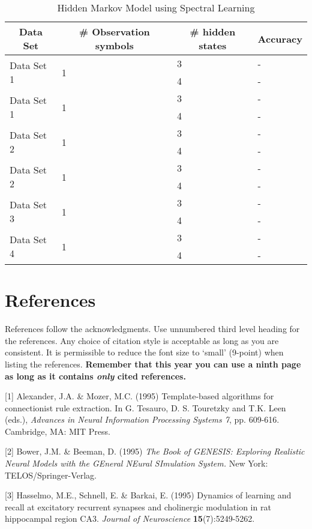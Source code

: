 \documentclass{article} %
\begin{document}
\begin{table}[t]
\caption{Hidden Markov Model using Spectral Learning}
\label{Spectral Learning}
\begin{center}
\begin{tabular}{ |l|l|l|l| }
\hline
\multicolumn{1}{|c|}{\bf Data Set} &\multicolumn{1}{|c|}{\bf \# Observation symbols} &\multicolumn{1}{|c|}{\bf \# hidden states} &\multicolumn{1}{|c|}{\bf Accuracy}\\
\hline
\multirow{2}{*}{Data Set 1}& \multirow{2}{*}{1} & 3 & - \\
& & 4 & - \\
\hline
\multirow{2}{*}{Data Set 1}& \multirow{2}{*}{1} & 3 & - \\
& & 4 & - \\
\hline
\multirow{2}{*}{Data Set 2}& \multirow{2}{*}{1} & 3 & - \\
& & 4 & - \\
\hline
\multirow{2}{*}{Data Set 2}& \multirow{2}{*}{1} & 3 & - \\
& & 4 & - \\
\hline
\multirow{2}{*}{Data Set 3}& \multirow{2}{*}{1} & 3 & - \\
& & 4 & - \\
\hline
\multirow{2}{*}{Data Set 4}& \multirow{2}{*}{1} & 3 & - \\
& & 4 & - \\
\hline
\end{tabular}
\end{center}
\end{table}

\section*{References}

References follow the acknowledgments. Use unnumbered third level heading for
the references. Any choice of citation style is acceptable as long as you are
consistent. It is permissible to reduce the font size to `small' (9-point) 
when listing the references. {\bf Remember that this year you can use
a ninth page as long as it contains \emph{only} cited references.}

\small{
[1] Alexander, J.A. \& Mozer, M.C. (1995) Template-based algorithms
for connectionist rule extraction. In G. Tesauro, D. S. Touretzky
and T.K. Leen (eds.), {\it Advances in Neural Information Processing
Systems 7}, pp. 609-616. Cambridge, MA: MIT Press.

[2] Bower, J.M. \& Beeman, D. (1995) {\it The Book of GENESIS: Exploring
Realistic Neural Models with the GEneral NEural SImulation System.}
New York: TELOS/Springer-Verlag.

[3] Hasselmo, M.E., Schnell, E. \& Barkai, E. (1995) Dynamics of learning
and recall at excitatory recurrent synapses and cholinergic modulation
in rat hippocampal region CA3. {\it Journal of Neuroscience}
{\bf 15}(7):5249-5262.
}
\end{document}
